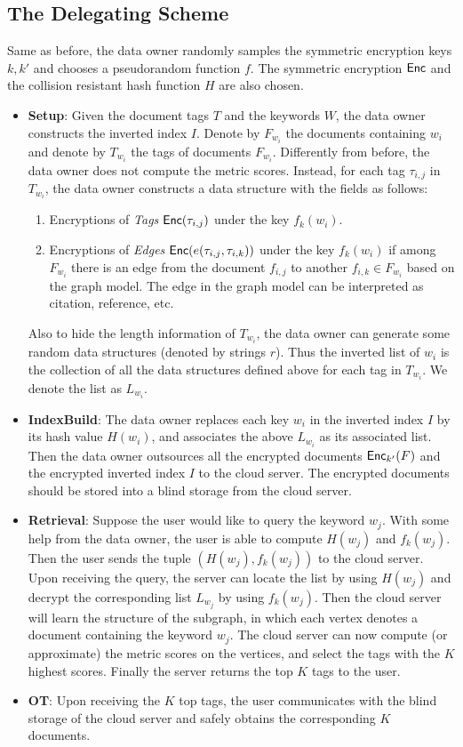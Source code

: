 \documentclass{IEEEtran}
\begin{document}
\subsection{The Delegating Scheme}
Same as before, the data owner randomly samples the symmetric encryption keys $k, k'$ and chooses a pseudorandom function $f$. The symmetric encryption $\textsf{Enc}$ and the collision resistant hash function $H$ are also chosen. 
\begin{itemize}
\item {\bf Setup}: Given the document tags $T$ and the keywords $W$, the data owner constructs the inverted index $I$. Denote by $F_{w_i}$ the documents containing $w_i$ and denote by $T_{w_i}$ the tags of documents $F_{w_i}$. Differently from before, the data owner does not compute the metric scores. Instead, for each tag $\tau_{i,j}$ in $T_{w_i}$, the data owner constructs a data structure with the fields as follows:
	\begin{enumerate}
	\item Encryptions of \emph{Tags} $\textsf{Enc}(\tau_{i,j})$ under the key $f_k(w_i)$.
	\item Encryptions of \emph{Edges} $\textsf{Enc}(e(\tau_{i,j}, \tau_{i,k}))$ under the key $f_k(w_i)$ if among $F_{w_i}$ there is an edge from the document $f_{i,j}$ to another $f_{i,k}\in F_{w_i}$ based on the graph model. The edge in the graph model can be interpreted as citation, reference, etc.
	\end{enumerate}
	Also to hide the length information of $T_{w_i}$, the data owner can generate some random data structures (denoted by strings $r$). 
	Thus the inverted list of $w_i$ is the collection of all the data structures defined above for each tag in $T_{w_i}$. We denote the list as $L_{w_i}$.
\item {\bf IndexBuild}: The data owner replaces each key $w_i$ in the inverted index $I$ by its hash value $H(w_i)$, and associates the above $L_{w_i}$ as its associated list. Then the data owner outsources all the encrypted documents $\textsf{Enc}_{k'}(F)$ and the encrypted inverted index $I$ to the cloud server. The encrypted documents should be stored into a blind storage from the cloud server.
\item {\bf Retrieval}: Suppose the user would like to query the keyword $w_j$. With some help from the data owner, the user is able to compute $H(w_j)$ and $f_k(w_j)$. Then the user sends the tuple $(H(w_j), f_k(w_j))$ to the cloud server. Upon receiving the query, the server can locate the list by using $H(w_j)$ and decrypt the corresponding list $L_{w_j}$ by using $f_k(w_j)$. Then the cloud server will learn the structure of the subgraph, in which each vertex denotes a document containing the keyword $w_j$. The cloud server can now compute (or approximate) the metric scores on the vertices, and select the tags with the $K$ highest scores. Finally the server returns the top $K$ tags to the user.
\item {\bf OT}: Upon receiving the $K$ top tags, the user communicates with the blind storage of the cloud server and safely obtains the corresponding $K$ documents.
\end{itemize}
\end{document}
